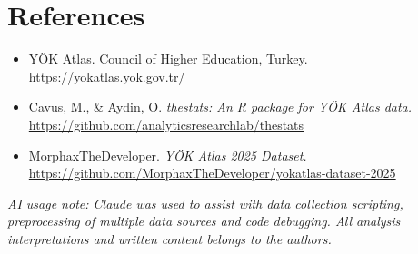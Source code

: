 \documentclass[
  11pt,
  a4paper,
  DIV=11,
  numbers=noendperiod]{scrartcl}
\providecommand{\tightlist}{%
  \setlength{\itemsep}{0pt}\setlength{\parskip}{0pt}}
\begin{document}
\section{References}\label{references}

\begin{itemize}
\tightlist
\item
  YÖK Atlas. Council of Higher Education, Turkey.
  \url{https://yokatlas.yok.gov.tr/}
\item
  Cavus, M., \& Aydin, O. \emph{thestats: An R package for YÖK Atlas
  data.} \url{https://github.com/analyticsresearchlab/thestats}
\item
  MorphaxTheDeveloper. \emph{YÖK Atlas 2025 Dataset.}
  \url{https://github.com/MorphaxTheDeveloper/yokatlas-dataset-2025}
\end{itemize}

\emph{AI usage note: Claude was used to assist with data collection
scripting, preprocessing of multiple data sources and code debugging.
All analysis interpretations and written content belongs to the
authors.}
\end{document}
